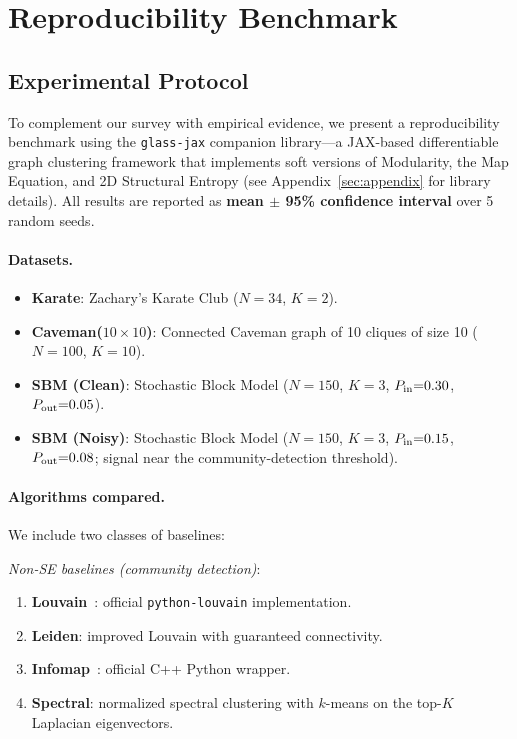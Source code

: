 \section{Reproducibility Benchmark}
\label{sec:benchmark}

\subsection{Experimental Protocol}
\label{subsec:benchmark-setup}

To complement our survey with empirical evidence, we present a reproducibility
benchmark using the \texttt{glass-jax} companion library---a JAX-based
differentiable graph clustering framework that implements soft versions of
Modularity, the Map Equation, and 2D Structural Entropy
(see Appendix~\ref{sec:appendix} for library details).
All results are reported as \textbf{mean $\pm$ 95\% confidence interval}
over 5 random seeds.

\paragraph{Datasets.}
\begin{itemize}
  \item \textbf{Karate}: Zachary's Karate Club ($N{=}34$, $K{=}2$).
  \item \textbf{Caveman($10{\times}10$)}: Connected Caveman graph of 10 cliques
        of size 10 ($N{=}100$, $K{=}10$).
  \item \textbf{SBM (Clean)}: Stochastic Block Model ($N{=}150$, $K{=}3$,
        $P_{\rm in}{=}0.30$, $P_{\rm out}{=}0.05$).
  \item \textbf{SBM (Noisy)}: Stochastic Block Model ($N{=}150$, $K{=}3$,
        $P_{\rm in}{=}0.15$, $P_{\rm out}{=}0.08$; signal near the
        community-detection threshold).
\end{itemize}

\paragraph{Algorithms compared.}

We include two classes of baselines:

\textit{Non-SE baselines (community detection)}:
\begin{enumerate}
  \item \textbf{Louvain}~\cite{newman2004findingmodularity}: official
        \texttt{python-louvain} implementation.
  \item \textbf{Leiden}: improved Louvain with guaranteed connectivity.
  \item \textbf{Infomap}~\cite{rosvall2008maps}: official C++ Python wrapper.
  \item \textbf{Spectral}: normalized spectral clustering
        with $k$-means on the top-$K$ Laplacian eigenvectors.
\end{enumerate}

